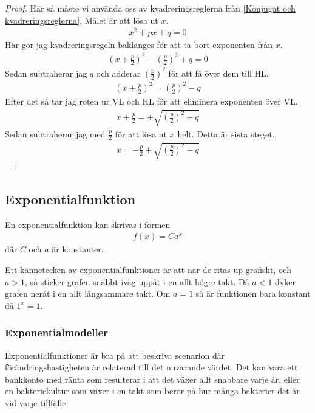 \begin{proof}
Här så måste vi använda oss av kvadreringsreglerna från \ref{Konjugat och kvadreringsreglerna}. Målet är att lösa ut $x$.
\begin{align}
	x^2+px+q = 0
\end{align}
Här gör jag kvadreringsregeln baklänges för att ta bort exponenten från $x$.
\begin{align}
	\left(x+\frac{p}{2}\right)^2-\left(\frac{p}{2}\right)^2+q = 0
\end{align}
Sedan subtraherar jag $q$ och adderar $\left(\frac{p}{2}\right)^2$ för att få över dem till HL.
\begin{align}
	\left(x+\frac{p}{2}\right)^2 = \left(\frac{p}{2}\right)^2 - q
\end{align}
Efter det så tar jag roten ur VL och HL för att eliminera exponenten över VL.
\begin{align}
	x+\frac{p}{2} = \pm \sqrt{\left(\frac{p}{2}\right)^2 - q}
\end{align}
Sedan subtraherar jag med $\frac{p}{2}$ för att lösa ut $x$ helt. Detta är sista steget.
\begin{align}
	x = -\frac{p}{2}\pm \sqrt{\left(\frac{p}{2}\right)^2 - q}
\end{align}
\end{proof}

\newpage
\subsection{Exponentialfunktion}

\begin{definition}
	En exponentialfunktion kan skrivas i formen
	\begin{align}
		f(x)=Ca^x
	\end{align}
	där $C$ och $a$ är konstanter.
 \end{definition}
 

Ett kännetecken av exponentialfunktioner är att när de ritas up grafiskt, och $a > 1$, så sticker grafen snabbt iväg uppåt i en allt högre takt. Då $a < 1$ dyker grafen neråt i en allt långsammare takt. Om $a=1$ så är funktionen bara konstant då $1^x=1$.

\subsubsection{Exponentialmodeller}

Exponentialfunktioner är bra på att beskriva scenarion där förändringshastigheten är relaterad till det nuvarande värdet. Det kan vara ett bankkonto med ränta som resulterar i att det växer allt snabbare varje år, eller en bakteriekultur som växer i en takt som beror på hur många bakterier det är vid varje tillfälle.

